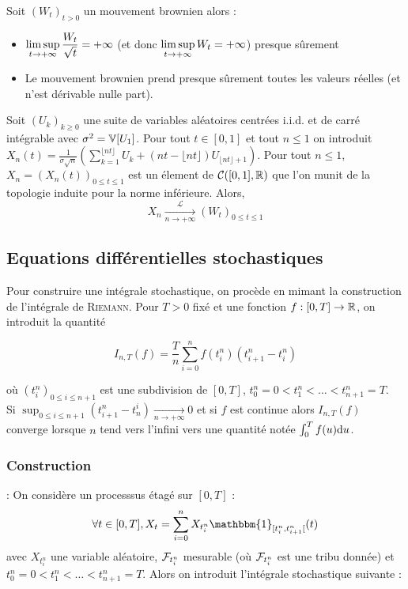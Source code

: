 \begin{prop}
  Soit $(W_t)_{t>0}$ un mouvement brownien alors :
  \begin{itemize}
    \item $\displaystyle\limsup_{t \to +\infty} \frac{W_t}{\sqrt{t}} = + \infty$ (et donc $\displaystyle\limsup_{t\to +\infty} W_t = +\infty$) presque sûrement
    \item Le mouvement brownien prend presque sûrement toutes les valeurs réelles (et n'est dérivable nulle part).
  \end{itemize}
\end{prop}

\begin{thm}[Donsker]
  Soit $(U_k)_{k\geq 0}$ une suite de variables aléatoires centrées i.i.d. et de carré intégrable avec $\sigma^2 = \mathbb{V}[U_1]$. Pour tout $t \in [0,1]$ et tout $n \leq 1$ on introduit $X_n(t) = \frac{1}{\sigma\sqrt{n}}\left(\sum_{k=1}^{\lfloor nt \rfloor} U_k + (nt - \lfloor nt \rfloor)U_{\lfloor nt \rfloor +1 }\right)$. Pour tout $n\leq 1$, $X_n = (X_n(t))_{0\leq t \leq 1}$ est un élement de $\mathcal{C}([0,1], \mathbb{R})$ que l'on munit de la topologie induite pour la norme inférieure.
Alors,
  \[ X_n \xrightarrow[n\to +\infty]{\mathcal{L}} (W_t)_{0 \leq t \leq 1} \]
\end{thm}

\subsection{Equations différentielles stochastiques}

Pour construire une intégrale stochastique, on procède en mimant la construction de l'intégrale de \textsc{Riemann}. Pour $T>0$ fixé et une fonction $f : [0,T] \rightarrow \mathbb{R}$, on introduit la quantité 

\[ I_{n,T}(f) = \frac{T}{n} \sum_{i=0}^n f(t_i^n)\left(t_{i+1}^n - t_i^n\right) \]

où $(t_i^n)_{0 \leq i \leq n+1}$ est une subdivision de $[0,T]$, $t_0^n = 0 < t_1^n < \ldots < t_{n+1}^n = T$. \\

Si $\sup_{0\leq i \leq n+1}(t_{i+1}^n - t_n^i)\xrightarrow[n\to +\infty]{} 0$ et si $f$ est continue alors $I_{n,T}(f)$ converge lorsque $n$ tend vers l'infini vers une quantité notée $ \int_{0}^{T} f(u) \mathrm{d} u$. \\

\subsubsection{Construction}
 : On considère un processsus étagé sur $[0,T]$ :
\[ \forall t \in [0, T], X_t = \sum_{i=0}^{n} X_{t_i^n} \mathbbm{1}_{[t_i^n, t_{i+1}^n[}(t) \]
avec $X_{t_i^n}$ une variable aléatoire, $\mathcal{F}_{t_i^n}$ mesurable (où $\mathcal{F}_{t_i^n}$ est une tribu donnée) et $t_0^n = 0 < t_1^n < \ldots < t_{n+1}^n = T$. Alors on introduit l'intégrale stochastique suivante :

